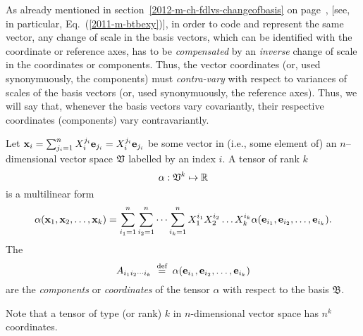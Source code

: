 As already mentioned in section~\ref{2012-m-ch-fdlvs-changeofbasis}
on page~\pageref{2012-m-ch-fdlvs-changeofbasis},
[see, in particular, Eq.~(\ref{2011-m-btbexy})],
in order to code and represent the same vector, any change of scale in the
basis vectors, which can be identified with the coordinate or reference axes,
has to be {\em compensated} by an {\em inverse} change of scale in the coordinates or components.
Thus, the vector coordinates (or, used synonymuously, the components) must {\em contra-vary}
with respect to variances of scales of the basis vectors (or, used synonymuously, the reference axes).
Thus, we will say that, whenever the basis vectors vary covariantly,
their respective coordinates (components) vary contravariantly.


Let  ${\bf x}_i =\sum_{j_i=1}^n X^{j_i}_i {\bf e}_{j_i} =X^{j_i}_i {\bf e}_{j_i}$
be some vector in (i.e., some element of) an $n$--dimensional vector space ${\frak V}$ labelled by an index $i$.
A tensor of rank $k$
\begin{equation}
\alpha:{ \frak V }^k \mapsto {\Bbb R}
\end{equation}
is a multilinear form
\begin{equation}
\alpha ( {\bf x}_1,{\bf x}_2,\ldots ,{\bf x}_k)=
\sum_{i_1=1}^n
\sum_{i_2=1}^n
\cdots
\sum_{i_k=1}^n
X^{i_1}_1 X^{i_2}_2\ldots X^{i_k}_k
\alpha ( {\bf e}_{i_1},{\bf e}_{i_2},\ldots ,{\bf e}_{i_k}).
\end{equation}
The
\begin{equation}
A_{{i_1}{i_2}\cdots {i_k}}
\stackrel{{\tiny \textrm{ def }}}{=}
\alpha ( {\bf e}_{i_1},{\bf e}_{i_2},\ldots ,{\bf e}_{i_k})
\end{equation}
 are the
{\em components} or
{\em coordinates}
of the tensor $\alpha $ with respect to the basis
${\mathfrak B}$.

Note that a tensor of type (or rank) $k$ in $n$-dimensional vector space has $n^k$  coordinates.

